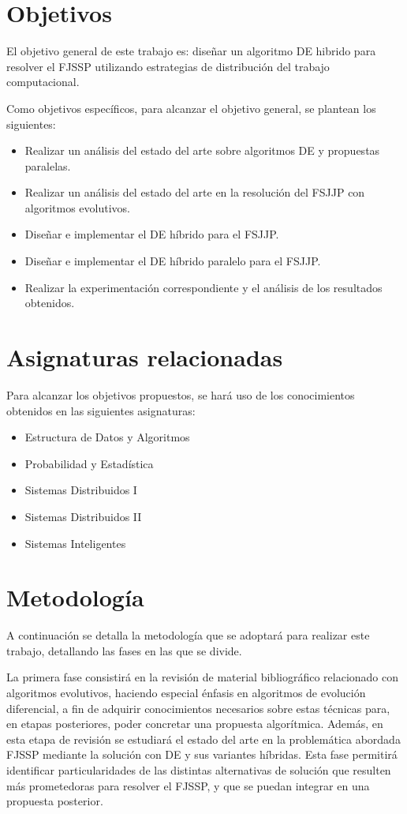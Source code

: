 \section{Objetivos}

El objetivo general de este trabajo es: diseñar un algoritmo DE hibrido para resolver el FJSSP utilizando
estrategias de distribución del trabajo computacional.


Como objetivos específicos, para alcanzar el objetivo general, se plantean los siguientes:
\begin{itemize}
    \item Realizar un análisis del estado del arte sobre algoritmos DE y propuestas paralelas.
    \item Realizar un análisis del estado del arte en la resolución del FSJJP con algoritmos evolutivos.
    \item Diseñar e implementar el DE híbrido para el FSJJP.
    \item Diseñar e implementar el DE híbrido paralelo para el FSJJP.
    \item Realizar la experimentación correspondiente y el análisis de los resultados obtenidos.
\end{itemize}


\section{Asignaturas relacionadas}
Para alcanzar los objetivos propuestos, se hará uso de los conocimientos obtenidos en las siguientes asignaturas:
\begin{itemize}
    \item Estructura de Datos y Algoritmos
    \item Probabilidad y Estadística
    \item Sistemas Distribuidos I
    \item Sistemas Distribuidos II
    \item Sistemas Inteligentes
\end{itemize}

\section{Metodología}

A continuación se detalla la metodología que se adoptará para realizar este trabajo, detallando las fases en las que se divide.


La primera fase consistirá en la revisión de material bibliográfico relacionado con algoritmos evolutivos, haciendo especial énfasis en algoritmos de evolución diferencial, a fin de adquirir conocimientos necesarios sobre estas técnicas para, en etapas posteriores, poder concretar una propuesta algorítmica. Además, en esta etapa de revisión se estudiará el estado del arte en la problemática abordada FJSSP mediante la solución con DE y sus variantes híbridas. Esta fase permitirá identificar particularidades de las distintas alternativas de solución que resulten más prometedoras para resolver el FJSSP, y que se puedan integrar en una propuesta posterior.


